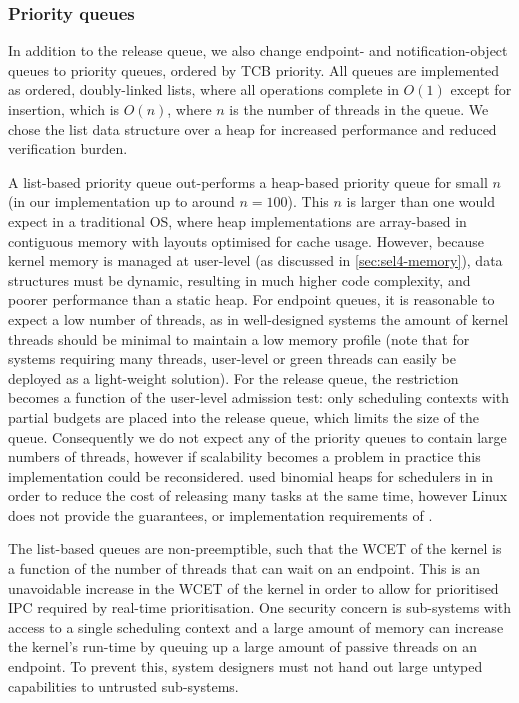 \subsubsection{Priority queues}

In addition to the release queue, we also change endpoint- and notification-object queues
to priority queues, ordered by \gls{TCB} priority. All queues are implemented as ordered, doubly-linked
lists, where all operations complete in $O(1)$ except for insertion, which is $O(n)$, where $n$ 
is the number of threads in the queue. 
We chose the list data structure over a heap for increased performance and reduced verification
burden. 

A list-based priority queue out-performs a heap-based priority queue for small $n$ (in our
implementation up to around $n = 100$).  This $n$ is larger than one would expect in a traditional
\gls{OS}, where heap implementations are array-based in contiguous memory with layouts optimised for
cache usage.  However, because \selfour kernel memory is
managed at user-level (as discussed in \cref{sec:sel4-memory}), data structures must be dynamic, 
resulting in much higher code complexity, and poorer performance than a static heap. 
For endpoint queues, it is reasonable to expect a low number of threads, 
as in well-designed systems the amount of kernel threads should be minimal to maintain a low memory
profile (note that for systems requiring many threads, user-level or green threads can easily be
deployed as a light-weight solution). 
For the release queue, the restriction
becomes a function of the user-level admission test: only scheduling contexts with 
partial budgets are placed into the release queue, which limits the size of the queue.
Consequently we do not expect any of the priority queues to contain large numbers of threads,
however if scalability becomes a problem in
practice this implementation could be reconsidered. \citet{Brandenburg:phd} used
binomial heaps for schedulers in \litmus in order to reduce the cost of releasing many tasks at the
same time, however Linux does not provide the guarantees, or
implementation requirements of \selfour.

The list-based queues are non-preemptible, such that the \gls{WCET} of the kernel is a function of the 
number of threads that can wait on an endpoint. This is an unavoidable increase in the \gls{WCET} of
the kernel in order to allow for prioritised \gls{IPC} required by real-time prioritisation.
One security concern is sub-systems with access to a single scheduling context and a large amount
of memory can increase the kernel's run-time by queuing up a large amount of passive threads on 
an endpoint. To prevent this, system designers must not hand out large untyped capabilities to
untrusted sub-systems.

